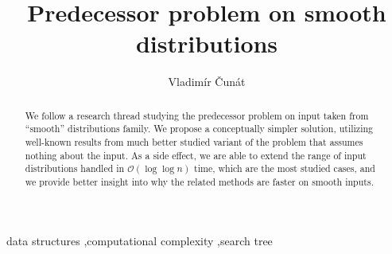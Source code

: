 \documentclass[twoside,english,preprint]{elsarticle}
\theoremstyle{plain}
\theoremstyle{definition}
\theoremstyle{remark}
\theoremstyle{plain}
\theoremstyle{plain}
\begin{document}

\def\nomath#1{\ifmmode\text{#1}\else#1\fi}


\def\interval#1#2{\left\langle#1,#2\right\rangle}
\def\intervalOC#1#2{\left(#1,#2\right\rangle}
\def\intervalOO#1#2{\left(#1,#2\right)}

\def\eqspaces{\;=\;}
\def\lespaces{\;\le\;}

\def\Prob#1{\Pr\!\left[#1\right]}
\def\ProbParam#1#2{\Pr_{#1}\!\left[#2\right]}
\def\Exp#1{\mathrm{E}\left[#1\right]}

\def\OO{\mathcal O}
\def\oo{\ensuremath o}

\def\diff#1{\mathrm{d}#1}
\def\euler{\mathrm{e}}
\def\natural{\mathbb{N}}

\def\emphDef#1{{\bf#1}}
\def\emphDefMath#1{\mathbf{#1}}

\def\setZeroTo#1{\{0,\dotsc,{#1}\}}



\begin{frontmatter}{}

\title{Predecessor problem on smooth distributions}

\author[mff,ui]{Vladim\'ir \v{C}un\'at}




\address[mff]{Faculty of Mathematics and Physics, Charles University in Prague,
Czech Republic }

\address[ui]{Institute of Computer Science, The Czech Academy of Sciences}
\begin{abstract}
We follow a research thread studying the predecessor problem on input
taken from ``smooth'' distributions family. We propose a conceptually
simpler solution, utilizing well-known results from much better studied
variant of the problem that assumes nothing about the input. As a
side effect, we are able to extend the range of input distributions
handled in $\OO\left(\log\log n\right)$ time, which are the most
studied cases, and we provide better insight into why the related
methods are faster on smooth inputs.
\end{abstract}
\begin{keyword}
data structures \sep computational complexity \sep search tree
\end{keyword}

\end{frontmatter}{}
\end{document}
